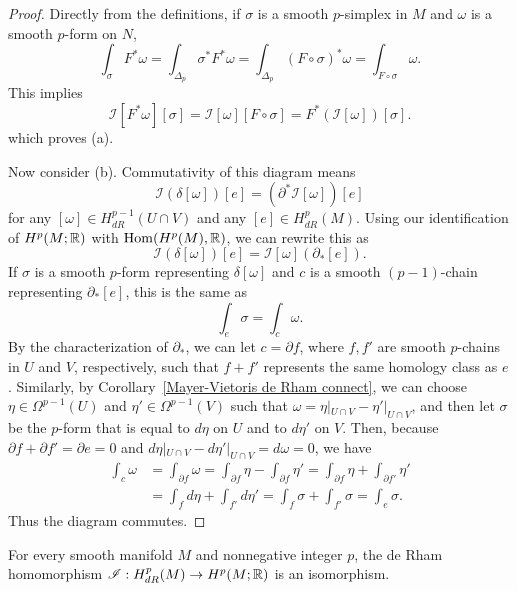 \begin{proof}
Directly from the definitions, if $\sigma$ is a smooth $p$-simplex in $M$ and $\omega$ is a smooth $p$-form on $N$,
\[\int_{\sigma}F^*\omega=\int_{\Delta_p}\sigma^*F^*\omega=\int_{\Delta_p}(F\circ\sigma)^*\omega=\int_{F\circ\sigma}\omega.\]
This implies
\[\mathscr{I}[F^*\omega][\sigma]=\mathscr{I}[\omega][F\circ\sigma]=F^*(\mathscr{I}[\omega])[\sigma].\]
which proves (a).\par
Now consider (b). Commutativity of this diagram means
\[\mathscr{I}(\delta[\omega])[e]=(\partial^*\mathscr{I}[\omega])[e]\]
for any $[\omega]\in H^{p-1}_{dR}(U\cap V)$ and any $[e]\in H^p_{dR}(M)$. Using our identification of $H^p(M;\mathbb{R})$ with $\mathrm{Hom}(H^p(M),\mathbb{R})$, we can rewrite this as
\[\mathscr{I}(\delta[\omega])[e]=\mathscr{I}[\omega](\partial_*[e]).\]
If $\sigma$ is a smooth $p$-form representing $\delta[\omega]$ and $c$ is a smooth $(p-1)$-chain representing $\partial_*[e]$, this is the same as 
\[\int_e\sigma=\int_c\omega.\]
By the characterization of $\partial_*$, we can let $c=\partial f$, where $f,f'$ are smooth $p$-chains in $U$ and $V$, respectively, such that $f+f'$ represents the 
same homology class as $e$. Similarly, by Corollary~\ref{Mayer-Vietoris de Rham connect}, we can choose $\eta\in\Omega^{p-1}(U)$ and $\eta'\in\Omega^{p-1}(V)$ such that $\omega=\eta|_{U\cap V}-\eta'|_{U\cap V}$, 
and then let $\sigma$ be the $p$-form that is equal to $d\eta$ on $U$ and to $d\eta'$ on $V$. Then, because $\partial f+\partial f'=\partial e=0$ and $d\eta|_{U\cap V}-d\eta'|_{U\cap V}=d\omega=0$, 
we have
\begin{align*}
\int_{c}\omega&=\int_{\partial f}\omega=\int_{\partial f}\eta-\int_{\partial f}\eta'=\int_{\partial f}\eta+\int_{\partial f'}\eta'\\
&=\int_{f}d\eta+\int_{f'}d\eta'=\int_f\sigma+\int_{f'}\sigma=\int_{e}\sigma.
\end{align*}
Thus the diagram commutes.
\end{proof}
\begin{theorem}
For every smooth manifold $M$ and nonnegative integer $p$, the de Rham homomorphism $\mathscr{I}:H^p_{dR}(M)\to H^p(M;\mathbb{R})$ is an isomorphism.
\end{theorem}
